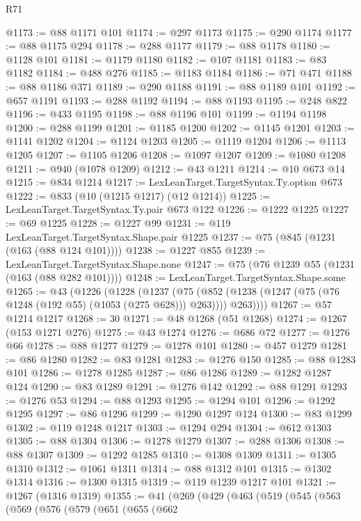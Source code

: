 \begin{lexlean}{R71}
\begin{coremodule}
@1173 := @88 @1171 @101
@1174 := @297 @1173
@1175 := @290 @1174
@1177 := @88 @1175 @294
@1178 := @288 @1177
@1179 := @88 @1178
@1180 := @1128 @101
@1181 := @1179 @1180
@1182 := @107 @1181
@1183 := @83 @1182
@1184 := @488 @276
@1185 := @1183 @1184
@1186 := @71 @471
@1188 := @88 @1186 @371
@1189 := @290 @1188
@1191 := @88 @1189 @101
@1192 := @657 @1191
@1193 := @288 @1192
@1194 := @88 @1193
@1195 := @248 @822
@1196 := @433 @1195
@1198 := @88 @1196 @101
@1199 := @1194 @1198
@1200 := @288 @1199
@1201 := @1185 @1200
@1202 := @1145 @1201
@1203 := @1141 @1202
@1204 := @1124 @1203
@1205 := @1119 @1204
@1206 := @1113 @1205
@1207 := @1105 @1206
@1208 := @1097 @1207
@1209 := @1080 @1208
@1211 := @940 (@1078 @1209)
@1212 := @43 @1211
@1214 := @10 @673 @14
@1215 := @834 @1214
@1217 := LexLeanTarget.TargetSyntax.Ty.option @673
@1222 := @833 (@10 (@1215 @1217) (@12 @1214))
@1225 := LexLeanTarget.TargetSyntax.Ty.pair @673 @122
@1226 := @1222 @1225
@1227 := @69 @1225
@1228 := @1227 @99
@1231 := @119 LexLeanTarget.TargetSyntax.Shape.pair @1225
@1237 := @75 (@845 (@1231 (@163 (@88 @124 @101))))
@1238 := @1227 @855
@1239 := LexLeanTarget.TargetSyntax.Shape.none
@1247 := @75 (@76 @1239 @55 (@1231 (@163 (@88 @282 @101))))
@1248 := LexLeanTarget.TargetSyntax.Shape.some
@1265 := @43
    (@1226
      (@1228
        (@1237
          (@75 (@852 (@1238 (@1247 (@75 (@76 @1248 (@192 @55) (@1053 (@275 @628))) @263)))) @263))))
@1267 := @57 @1214 @1217
@1268 := 30
@1271 := @48 @1268 (@51 @1268)
@1274 := @1267 (@153 @1271 @276)
@1275 := @43 @1274
@1276 := @686 @72
@1277 := @1276 @66
@1278 := @88 @1277
@1279 := @1278 @101
@1280 := @457 @1279
@1281 := @86 @1280
@1282 := @83 @1281
@1283 := @1276 @150
@1285 := @88 @1283 @101
@1286 := @1278 @1285
@1287 := @86 @1286
@1289 := @1282 @1287 @124
@1290 := @83 @1289
@1291 := @1276 @142
@1292 := @88 @1291
@1293 := @1276 @53
@1294 := @88 @1293
@1295 := @1294 @101
@1296 := @1292 @1295
@1297 := @86 @1296
@1299 := @1290 @1297 @124
@1300 := @83 @1299
@1302 := @119 @1248 @1217
@1303 := @1294 @294
@1304 := @612 @1303
@1305 := @88 @1304
@1306 := @1278 @1279
@1307 := @288 @1306
@1308 := @88 @1307
@1309 := @1292 @1285
@1310 := @1308 @1309
@1311 := @1305 @1310
@1312 := @1061 @1311
@1314 := @88 @1312 @101
@1315 := @1302 @1314
@1316 := @1300 @1315
@1319 := @119 @1239 @1217 @101
@1321 := @1267 (@1316 @1319)
@1355 := @41
    (@269
      (@429
        (@463
          (@519
            (@545
              (@563
                (@569
                  (@576
                    (@579
                      (@651
                        (@655
                          (@662

\end{coremodule}
\end{lexlean}
